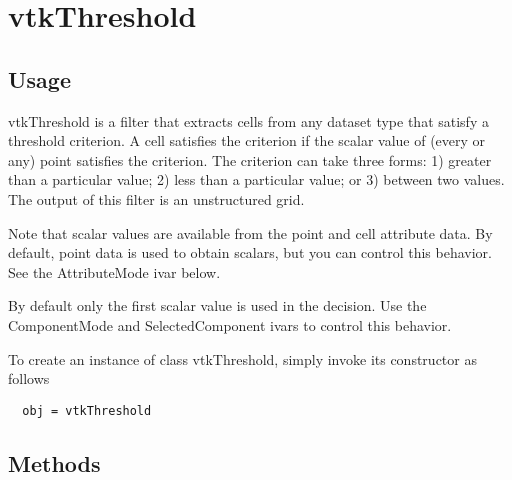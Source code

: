 \section{vtkThreshold}

\subsection{Usage}

 vtkThreshold is a filter that extracts cells from any dataset type that
 satisfy a threshold criterion. A cell satisfies the criterion if the
 scalar value of (every or any) point satisfies the criterion. The
 criterion can take three forms: 1) greater than a particular value; 2)
 less than a particular value; or 3) between two values. The output of this
 filter is an unstructured grid.

 Note that scalar values are available from the point and cell attribute
 data.  By default, point data is used to obtain scalars, but you can
 control this behavior. See the AttributeMode ivar below.

 By default only the first scalar value is used in the decision. Use the ComponentMode
 and SelectedComponent ivars to control this behavior.

To create an instance of class vtkThreshold, simply
invoke its constructor as follows
\begin{verbatim}
  obj = vtkThreshold
\end{verbatim}
\subsection{Methods}

